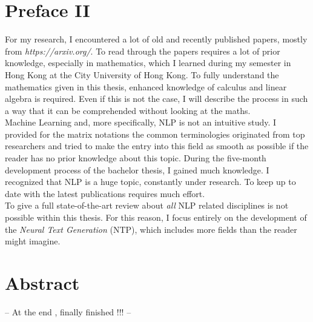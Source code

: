 \section*{Preface II}
\label{sec:prolog_2}
For my research, I encountered a lot of old and recently published papers, mostly from \textit{https://arxiv.org/}. 
To read through the papers requires a lot of prior knowledge, especially in mathematics, which I learned during my semester in Hong Kong at the City University of Hong Kong. 
To fully understand the mathematics given in this thesis, enhanced knowledge of calculus and linear algebra is required. Even if this is not the case, I will describe the process in such a way that it can be comprehended without looking at the maths. \\
Machine Learning and, more specifically, NLP is not an intuitive study. I provided for the matrix notations the common terminologies originated from top researchers and tried to make the entry into this field as smooth as possible if the reader has no prior knowledge about this topic.
During the five-month development process of the bachelor thesis, I gained much knowledge. I recognized that NLP is a huge topic, constantly under research. To keep up to date with the latest publications requires much effort. \\
To give a full state-of-the-art review about \textit{all} NLP related disciplines is not possible within this thesis. For this reason, I focus entirely on the development of the \textit{Neural Text Generation} (NTP), which includes more fields than the reader might imagine.




\section*{Abstract}
\label{sec:abstract}

-- At the end , finally finished !!! --